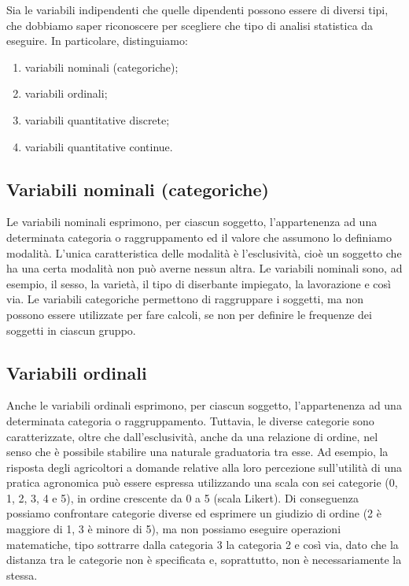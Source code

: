 \documentclass[a4paper,12pt,oneside]{book}
\providecommand{\tightlist}{%
  \setlength{\itemsep}{0pt}\setlength{\parskip}{0pt}}
\begin{document}
Sia le variabili indipendenti che quelle dipendenti possono essere di diversi tipi, che dobbiamo saper riconoscere per scegliere che tipo di analisi statistica da eseguire. In particolare, distinguiamo:

\begin{enumerate}
\def\labelenumi{\arabic{enumi}.}
\tightlist
\item
  variabili nominali (categoriche);
\item
  variabili ordinali;
\item
  variabili quantitative discrete;
\item
  variabili quantitative continue.
\end{enumerate}

\hypertarget{variabili-nominali-categoriche}{%
\subsection{Variabili nominali (categoriche)}\label{variabili-nominali-categoriche}}

Le variabili nominali esprimono, per ciascun soggetto, l'appartenenza ad una determinata categoria o raggruppamento ed il valore che assumono lo definiamo modalità. L'unica caratteristica delle modalità è l'esclusività, cioè un soggetto che ha una certa modalità non può averne nessun altra. Le variabili nominali sono, ad esempio, il sesso, la varietà, il tipo di diserbante impiegato, la lavorazione e così via. Le variabili categoriche permettono di raggruppare i soggetti, ma non possono essere utilizzate per fare calcoli, se non per definire le frequenze dei soggetti in ciascun gruppo.

\hypertarget{variabili-ordinali}{%
\subsection{Variabili ordinali}\label{variabili-ordinali}}

Anche le variabili ordinali esprimono, per ciascun soggetto, l'appartenenza ad una determinata categoria o raggruppamento. Tuttavia, le diverse categorie sono caratterizzate, oltre che dall'esclusività, anche da una relazione di ordine, nel senso che è possibile stabilire una naturale graduatoria tra esse. Ad esempio, la risposta degli agricoltori a domande relative alla loro percezione sull'utilità di una pratica agronomica può essere espressa utilizzando una scala con sei categorie (0, 1, 2, 3, 4 e 5), in ordine crescente da 0 a 5 (scala Likert). Di conseguenza possiamo confrontare categorie diverse ed esprimere un giudizio di ordine (2 è maggiore di 1, 3 è minore di 5), ma non possiamo eseguire operazioni matematiche, tipo sottrarre dalla categoria 3 la categoria 2 e così via, dato che la distanza tra le categorie non è specificata e, soprattutto, non è necessariamente la stessa.
\end{document}
